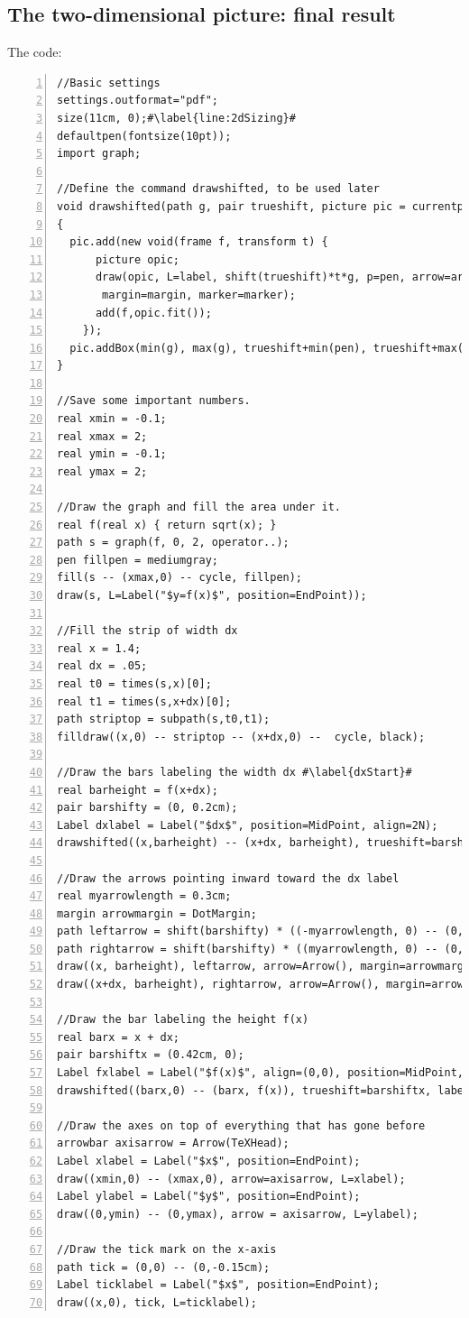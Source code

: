 \documentclass{article}
\begin{document}
\subsection{The two-dimensional picture: final result}
The code:
\begin{lstlisting}[numbers=left, flexiblecolumns, escapechar=\#]
//Basic settings
settings.outformat="pdf";
size(11cm, 0);#\label{line:2dSizing}#
defaultpen(fontsize(10pt));
import graph;

//Define the command drawshifted, to be used later
void drawshifted(path g, pair trueshift, picture pic = currentpicture, Label label="", pen pen=currentpen, arrowbar arrow=None, arrowbar bar=None, margin margin=NoMargin, marker marker=nomarker)
{
  pic.add(new void(frame f, transform t) {
      picture opic;
      draw(opic, L=label, shift(trueshift)*t*g, p=pen, arrow=arrow, bar=bar,
	   margin=margin, marker=marker);
      add(f,opic.fit());
    });
  pic.addBox(min(g), max(g), trueshift+min(pen), trueshift+max(pen));
}

//Save some important numbers.
real xmin = -0.1;
real xmax = 2;
real ymin = -0.1;
real ymax = 2;

//Draw the graph and fill the area under it.
real f(real x) { return sqrt(x); }
path s = graph(f, 0, 2, operator..);
pen fillpen = mediumgray;
fill(s -- (xmax,0) -- cycle, fillpen);
draw(s, L=Label("$y=f(x)$", position=EndPoint));

//Fill the strip of width dx
real x = 1.4;
real dx = .05;
real t0 = times(s,x)[0];
real t1 = times(s,x+dx)[0];
path striptop = subpath(s,t0,t1);
filldraw((x,0) -- striptop -- (x+dx,0) --  cycle, black);

//Draw the bars labeling the width dx #\label{dxStart}#
real barheight = f(x+dx);
pair barshifty = (0, 0.2cm);
Label dxlabel = Label("$dx$", position=MidPoint, align=2N);
drawshifted((x,barheight) -- (x+dx, barheight), trueshift=barshifty, label=dxlabel, bar=Bars);

//Draw the arrows pointing inward toward the dx label
real myarrowlength = 0.3cm;
margin arrowmargin = DotMargin;
path leftarrow = shift(barshifty) * ((-myarrowlength, 0) -- (0,0));
path rightarrow = shift(barshifty) * ((myarrowlength, 0) -- (0,0));
draw((x, barheight), leftarrow, arrow=Arrow(), margin=arrowmargin);
draw((x+dx, barheight), rightarrow, arrow=Arrow(), margin=arrowmargin); #\label{dxEnd}#

//Draw the bar labeling the height f(x)
real barx = x + dx;
pair barshiftx = (0.42cm, 0);
Label fxlabel = Label("$f(x)$", align=(0,0), position=MidPoint, filltype=Fill(fillpen));
drawshifted((barx,0) -- (barx, f(x)), trueshift=barshiftx, label=fxlabel, arrow=Arrows(), bar=Bars); 

//Draw the axes on top of everything that has gone before
arrowbar axisarrow = Arrow(TeXHead);
Label xlabel = Label("$x$", position=EndPoint);
draw((xmin,0) -- (xmax,0), arrow=axisarrow, L=xlabel);
Label ylabel = Label("$y$", position=EndPoint);
draw((0,ymin) -- (0,ymax), arrow = axisarrow, L=ylabel);

//Draw the tick mark on the x-axis
path tick = (0,0) -- (0,-0.15cm);
Label ticklabel = Label("$x$", position=EndPoint);
draw((x,0), tick, L=ticklabel);
\end{lstlisting}
%
\end{document}
